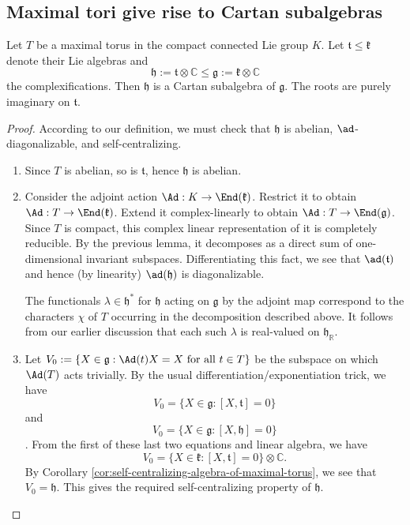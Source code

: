 \documentclass[reqno]{amsart} 
\begin{document}
\subsection{Maximal tori give rise to Cartan subalgebras}
\label{sec:org1044d7f}
\begin{theorem}
  Let $T$ be a maximal torus in the compact connected Lie group $K$.  Let $\mathfrak{t} \leq \mathfrak{k}$ denote their Lie algebras and
  \begin{equation*}
    \mathfrak{h} := \mathfrak{t} \otimes \mathbb{C} \leq \mathfrak{g} := \mathfrak{k} \otimes \mathbb{C}
  \end{equation*}
  the complexifications.  Then $\mathfrak{h}$ is a Cartan subalgebra of $\mathfrak{g}$.  The roots are purely imaginary on $\mathfrak{t}$.
\end{theorem}
\begin{proof}
  According to our definition, we must check that $\mathfrak{h}$ is abelian, $\ad$-diagonalizable, and self-centralizing.

  \begin{enumerate}
  \item Since $T$ is abelian, so is $\mathfrak{t}$, hence $\mathfrak{h}$ is abelian.
  \item Consider the adjoint action $\Ad : K \rightarrow \End(\mathfrak{k})$.  Restrict it to obtain $\Ad : T \rightarrow \End(\mathfrak{k})$.  Extend it complex-linearly to obtain $\Ad : T \rightarrow \End(\mathfrak{g})$.  Since $T$ is compact, this complex linear representation of it is completely reducible.  By the previous lemma, it decomposes as a direct sum of one-dimensional invariant subspaces.  Differentiating this fact, we see that $\ad(\mathfrak{t})$ and hence (by linearity) $\ad(\mathfrak{h})$ is diagonalizable.

    The functionals $\lambda \in \mathfrak{h}^*$ for $\mathfrak{h}$ acting on $\mathfrak{g}$ by the adjoint map correspond to the characters $\chi$ of $T$ occurring in the decomposition described above.  It follows from our earlier discussion that each such $\lambda$ is real-valued on $\mathfrak{h}_\mathbb{R}$.
  \item Let $V_0 := \{X \in \mathfrak{g} : \Ad(t) X = X \text{ for all } t \in T\}$ be the subspace on which $\Ad(T)$ acts trivially.  By the usual differentiation/exponentiation trick, we have
    \begin{equation*}
V_0 = \{X \in \mathfrak{g} : [X,\mathfrak{t}] = 0\}
\end{equation*}
and
    \begin{equation*}
V_0 = \{X \in \mathfrak{g} : [X,\mathfrak{h}] = 0\}
\end{equation*}
.  From the first of these last two equations and linear algebra, we have
    \begin{equation*}
      V_0 = \{X \in \mathfrak{k} : [X,\mathfrak{t}] = 0\} \otimes \mathbb{C}.
    \end{equation*}
    By Corollary \ref{cor:self-centralizing-algebra-of-maximal-torus}, we see that $V_0 = \mathfrak{h}$.  This gives the required self-centralizing property of $\mathfrak{h}$.
  \end{enumerate}
\end{proof}
\end{document}
